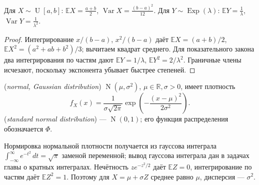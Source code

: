 \begin{theorem}
Для \(X\sim\operatorname U[a,b]\): \(\mathbb EX=\frac{a+b}2\), \(\operatorname{Var}X=\frac{(b-a)^2}{12}\). Для \(Y\sim\operatorname{Exp}(\lambda)\): \(\mathbb EY=\frac1\lambda\), \(\operatorname{Var}Y=\frac1{\lambda^2}\).
\end{theorem}
\begin{proof}Интегрирование \(x/(b-a)\), \(x^2/(b-a)\) даёт \(\mathbb EX=(a+b)/2\), \(\mathbb EX^2=(a^2+ab+b^2)/3\); вычитаем квадрат среднего. Для показательного закона два интегрирования по частям дают \(\mathbb EY=1/\lambda\), \(\mathbb EY^2=2/\lambda^2\). Граничные члены исчезают, поскольку экспонента убывает быстрее степеней.\end{proof}
\begin{definition} (\emph{normal, Gaussian distribution}) \(\operatorname N(\mu,\sigma^2)\), \(\mu\in\mathbb R,\sigma>0\), имеет плотность
\[
 f_X(x)=\frac1{\sigma\sqrt{2\pi}}\exp\!\left(-\frac{(x-\mu)^2}{2\sigma^2}\right).
\]
 (\emph{standard normal distribution}) — \(\operatorname N(0,1)\); его функция распределения обозначается \(\Phi\).\end{definition}
Нормировка нормальной плотности получается из гауссова интеграла \(\int_{-\infty}^\infty e^{-t^2}\,dt=\sqrt\pi\) заменой переменной; вывод гауссова интеграла дан в задачах главы о кратных интегралах. Нечётность \(z e^{-z^2/2}\) даёт \(\mathbb EZ=0\), интегрирование по частям даёт \(\mathbb EZ^2=1\). Поэтому для \(X=\mu+\sigma Z\) среднее равно \(\mu\), дисперсия — \(\sigma^2\).
